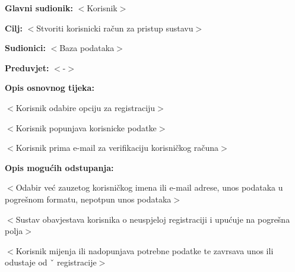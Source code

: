 					\noindent {}
					\begin{packed_item}
	
						\item \textbf{Glavni sudionik: }$<$Korisnik$>$
						\item  \textbf{Cilj:} $<$Stvoriti korisnicki račun za pristup sustavu$>$
						\item  \textbf{Sudionici:} $<$Baza podataka$>$
						\item  \textbf{Preduvjet:} $<$-$>$
						\item  \textbf{Opis osnovnog tijeka:}
						
						\item[] \begin{packed_enum}
	
							\item $<$Korisnik odabire opciju za registraciju$>$
							\item $<$Korisnik popunjava korisnicke podatke$>$
							\item $<$Korisnik prima e-mail za verifikaciju korisničkog računa$>$
						\end{packed_enum}
						
						\item  \textbf{Opis mogućih odstupanja:}
						
						\item[] \begin{packed_item}
	
							\item[2.a] $<$Odabir već zauzetog korisničkog imena ili e-mail adrese, unos podataka
							u pogrešnom formatu, nepotpun unos podataka$>$
							\item[] \begin{packed_enum}
								
								\item $<$Sustav obavjestava korisnika o neuspjeloj registraciji i upućuje na pogrešna polja$>$
								\item $<$Korisnik mijenja ili nadopunjava potrebne podatke te zavrsava unos ili odustaje od ˇ
								registracije$>$
								
							\end{packed_enum}
							
						\end{packed_item}
					\end{packed_item}
					
